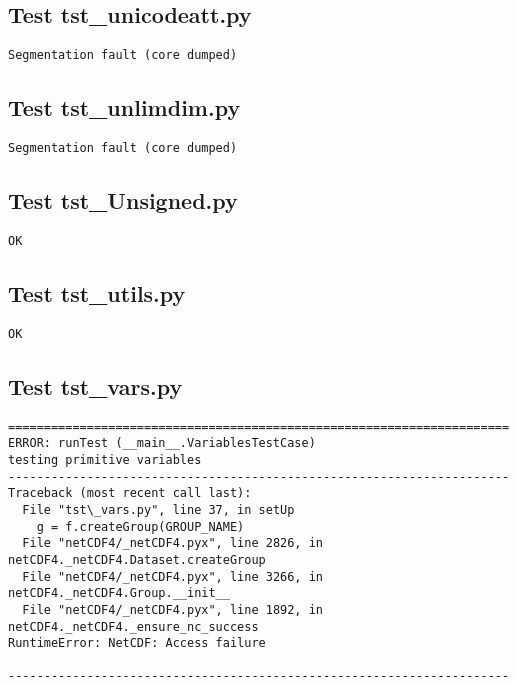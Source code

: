 \subsection{Test tst\_unicodeatt.py}

\begin{verbatim}
Segmentation fault (core dumped)
\end{verbatim}

\subsection{Test tst\_unlimdim.py}

\begin{verbatim}
Segmentation fault (core dumped)
\end{verbatim}

\subsection{Test tst\_Unsigned.py}

\begin{verbatim}
OK
\end{verbatim}

\subsection{Test tst\_utils.py}

\begin{verbatim}
OK
\end{verbatim}

\subsection{Test tst\_vars.py}

\begin{verbatim}
======================================================================
ERROR: runTest (__main__.VariablesTestCase)
testing primitive variables
----------------------------------------------------------------------
Traceback (most recent call last):
  File "tst\_vars.py", line 37, in setUp
    g = f.createGroup(GROUP_NAME)
  File "netCDF4/_netCDF4.pyx", line 2826, in netCDF4._netCDF4.Dataset.createGroup
  File "netCDF4/_netCDF4.pyx", line 3266, in netCDF4._netCDF4.Group.__init__
  File "netCDF4/_netCDF4.pyx", line 1892, in netCDF4._netCDF4._ensure_nc_success
RuntimeError: NetCDF: Access failure

----------------------------------------------------------------------
\end{verbatim}

